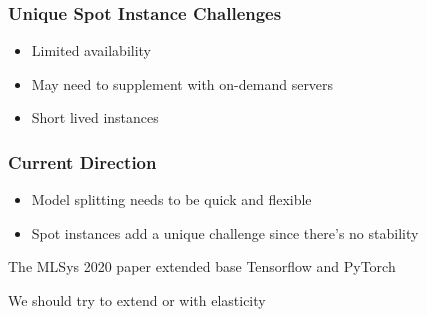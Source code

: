   \begin{frame}
    \frametitle{Unique Spot Instance Challenges}

    \begin{itemize}
      \item Limited availability

      \vspace{2em}
      \item May need to supplement with on-demand servers

      \vspace{2em}
      \item Short lived instances

    \end{itemize}

  \end{frame}

  \begin{frame}
    \frametitle{Current Direction}

    \vspace{2em}
    \begin{itemize}
      \item Model splitting needs to be quick and flexible
      \vspace{2em}
      \item Spot instances add a unique challenge since there's no stability
    \end{itemize}
    \vspace{2em}

    The MLSys 2020 paper extended base Tensorflow and PyTorch 

    \hspace{2em} We should try to extend  or  with elasticity
  \end{frame}


